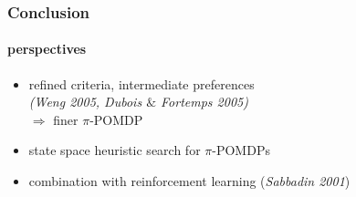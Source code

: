 \documentclass[12pt,svgnames,table]{beamer}
\begin{document}
\begin{frame}
\frametitle{Conclusion}
\framesubtitle{\footnotesize perspectives}

\begin{exampleblock}{}
\begin{itemize}
\item refined criteria, intermediate preferences\\ 
{\footnotesize \textit{(Weng 2005, Dubois $\&$ Fortemps 2005)}}\\ 
\hspace{4cm} $\Rightarrow$ finer $\pi$-POMDP
\item state space heuristic search for $\pi$-POMDPs
\item combination with reinforcement learning (\footnotesize \textit{Sabbadin 2001})
\end{itemize}
\end{exampleblock}

\end{frame}
\end{document}
